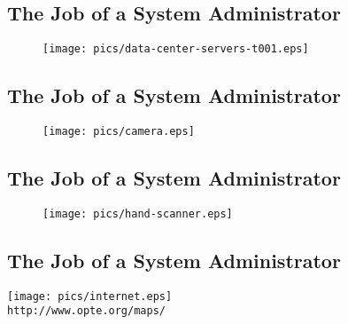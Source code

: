 \documentclass[xga]{xdvislides}
\begin{document}
\subsection{The Job of a System Administrator}
\vspace*{\fill}
\begin{figure}[hb]
	\begin{center}
		\texttt{[image: pics/data-center-servers-t001.eps]} \\
	\end{center}
\end{figure}
\vspace*{\fill}

\subsection{The Job of a System Administrator}
\vspace*{\fill}
\begin{figure}[hb]
	\begin{center}
		\texttt{[image: pics/camera.eps]} \\
	\end{center}
\end{figure}
\vspace*{\fill}

\subsection{The Job of a System Administrator}
\vspace*{\fill}
\begin{figure}[hb]
	\begin{center}
		\texttt{[image: pics/hand-scanner.eps]} \\
	\end{center}
\end{figure}
\vspace*{\fill}


\subsection{The Job of a System Administrator}
\vspace*{\fill}
\begin{center}
	\texttt{[image: pics/internet.eps]} \\
	\small
	{\tt http://www.opte.org/maps/}
	\Normalsize
\end{center}
\vspace*{\fill}
\end{document}
